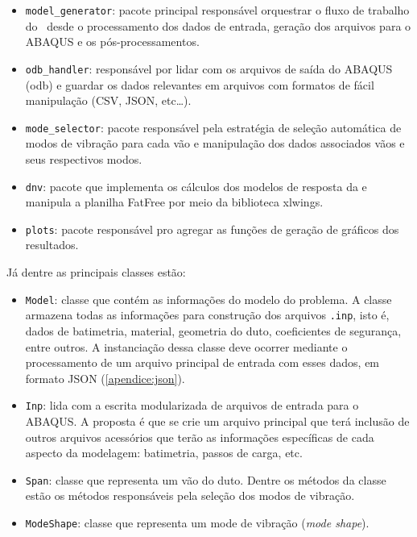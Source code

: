 \begin{itemize}
    \item \texttt{model\_generator}: pacote principal responsável orquestrar o fluxo de trabalho do \frame\ desde o processamento dos dados de entrada, geração dos arquivos para o ABAQUS e os pós-processamentos.

    \item \texttt{odb\_handler}: responsável por lidar com os arquivos de saída do ABAQUS (odb) e guardar os dados relevantes em arquivos com formatos de fácil manipulação (CSV, JSON, etc\ldots).

    \item \texttt{mode\_selector}: pacote responsável pela estratégia de seleção automática de modos de vibração para cada vão e manipulação dos dados associados vãos e seus respectivos modos.

    \item \texttt{dnv}: pacote que implementa os cálculos dos modelos de resposta da  e manipula a planilha FatFree por meio da biblioteca xlwings.

    \item \texttt{plots}: pacote responsável pro agregar as funções de geração de gráficos dos resultados.
\end{itemize}

Já dentre as principais classes estão:

\begin{itemize}
    \item \texttt{Model}: classe que contém as informações do modelo do problema.
    A classe armazena todas as informações para construção dos arquivos \texttt{.inp}, isto é, dados de batimetria, material, geometria do duto, coeficientes de segurança, entre outros.
    A instanciação dessa classe deve ocorrer mediante o processamento de um arquivo principal de entrada com esses dados, em formato JSON (\autoref{apendice:json}).

    \item \texttt{Inp}: lida com a escrita modularizada de arquivos de entrada  para o ABAQUS. A proposta é que se crie um arquivo principal que terá inclusão de outros arquivos acessórios que terão as informações específicas de cada aspecto da modelagem: batimetria, passos de carga, etc.

    \item \texttt{Span}: classe que representa um vão do duto. Dentre os métodos da classe estão os métodos responsáveis pela seleção dos modos de vibração.

    \item \texttt{ModeShape}: classe que representa um mode de vibração (\textit{mode shape}).
\end{itemize}

